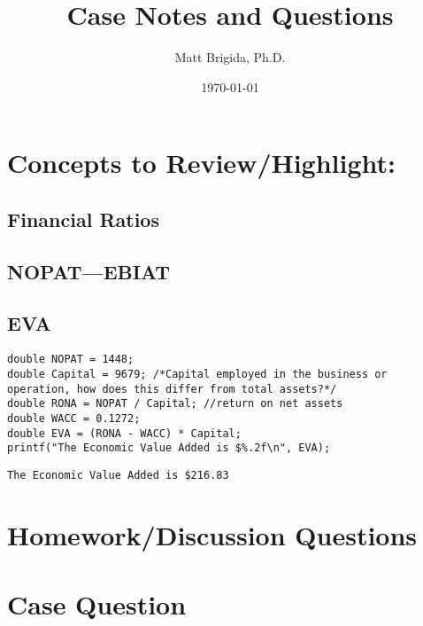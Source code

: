 \documentclass[11pt]{article}
\author{Matt Brigida, Ph.D.}
\date{\today}
\title{Case Notes and Questions}
\begin{document}
\maketitle

\section{Concepts to Review/Highlight:}
\label{sec:org7127c49}
\subsection{Financial Ratios}
\label{sec:orgeccc60d}
\subsection{NOPAT---EBIAT}
\label{sec:org89f6bc4}
\subsection{EVA}
\label{sec:org36ee537}

\begin{verbatim}
double NOPAT = 1448;
double Capital = 9679; /*Capital employed in the business or operation, how does this differ from total assets?*/
double RONA = NOPAT / Capital; //return on net assets
double WACC = 0.1272;
double EVA = (RONA - WACC) * Capital;
printf("The Economic Value Added is $%.2f\n", EVA);
\end{verbatim}

\begin{verbatim}
The Economic Value Added is $216.83
\end{verbatim}



\section{Homework/Discussion Questions}
\label{sec:org584a689}


\section{Case Question}
\label{sec:org8ce2b7a}
\end{document}
